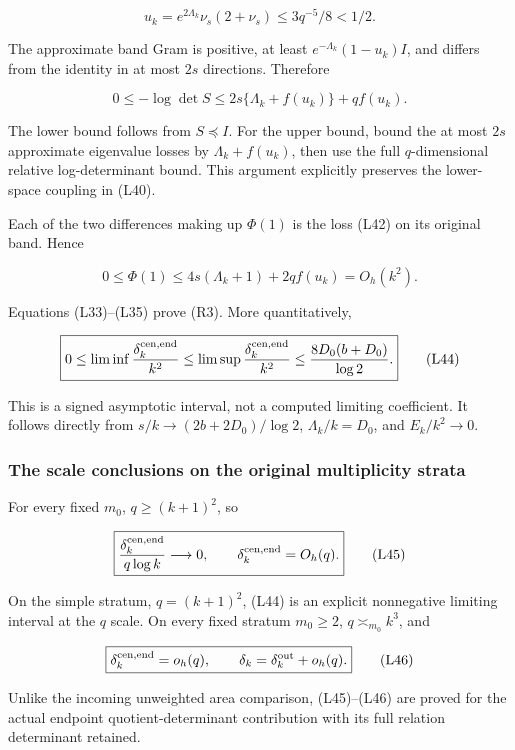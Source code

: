 \[
u_k=e^{2\Lambda_k}\nu_s(2+\nu_s)\le3q^{-5}/8<1/2.
\]

The approximate band Gram is positive, at least
\(e^{-\Lambda_k}(1-u_k)I\), and differs from the identity in at most \(2s\) directions. Therefore

\[
0\le-\log\det S\le2s\{\Lambda_k+f(u_k)\}+qf(u_k).
\tag{L42}
\]

The lower bound follows from \(S\preceq I\). For the upper bound, bound the at most \(2s\) approximate eigenvalue losses by \(\Lambda_k+f(u_k)\), then use the full \(q\)-dimensional relative log-determinant bound. This argument explicitly preserves the lower-space coupling in (L40).

Each of the two differences making up \(\Phi(1)\) is the loss (L42) on its original band. Hence

\[
\boxed{0\le\Phi(1)\le4s(\Lambda_k+1)+2qf(u_k)=O_h(k^2).}
\tag{L43}
\]

Equations (L33)--(L35) prove (R3). More quantitatively,

\[
\boxed{0\le\liminf\frac{\delta_k^{\rm cen,end}}{k^2}
\le\limsup\frac{\delta_k^{\rm cen,end}}{k^2}
\le\frac{8D_0(b+D_0)}{\log2}.}
\tag{L44}
\]

This is a signed asymptotic interval, not a computed limiting coefficient. It follows directly from \(s/k\to(2b+2D_0)/\log2\), \(\Lambda_k/k=D_0\), and \(E_k/k^2\to0\).

\subsubsection{The scale conclusions on the original multiplicity strata}\label{the-scale-conclusions-on-the-original-multiplicity-strata}

For every fixed \(m_0\), \(q\ge(k+1)^2\), so

\[
\boxed{\frac{\delta_k^{\rm cen,end}}{q\log k}\longrightarrow0,
\qquad \delta_k^{\rm cen,end}=O_h(q).}
\tag{L45}
\]

On the simple stratum, \(q=(k+1)^2\), (L44) is an explicit nonnegative limiting interval at the \(q\) scale. On every fixed stratum \(m_0\ge2\),
\(q\asymp_{m_0}k^3\), and

\[
\boxed{\delta_k^{\rm cen,end}=o_h(q),\qquad
\delta_k=\delta_k^{\rm out}+o_h(q).}
\tag{L46}
\]

Unlike the incoming unweighted area comparison, (L45)--(L46) are proved for the actual endpoint quotient-determinant contribution with its full relation determinant retained.

